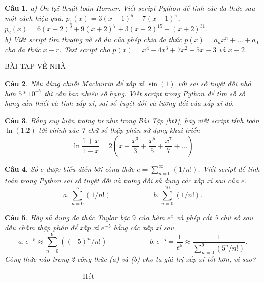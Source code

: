 \documentclass[answers]{exam}
\newtheorem{bt}{Câu}
\begin{document}
\begin{bt} a) Ôn lại thuật toán Horner. Viết script Python để tính các đa thức sau một cách hiệu quả.
$p_1(x) = 3(x-1)^5+7(x-1)^9$, \quad $p_2(x) = 6(x+2)^3 + 9(x+2)^7 + 3 (x+2)^{15} - (x+2)^{31}.$	 \\
	
b) Viết script tìm thương và số dư của phép chia đa thức $p(x)=a_nx^n+...+a_0$ cho đa thức $x-r$.
Test script cho $p(x)=x^4-4x^3+7x^2-5x-3$ và $x-2$.
\end{bt}


BÀI TẬP VỀ NHÀ

\begin{bt}
Nếu dùng chuỗi Maclaurin để xấp xỉ $\sin(1)$ với sai số tuyệt đối nhỏ hơn $5 * 10^{-7}$ thì cần bao nhiêu số hạng. Viết script trong Python để tìm số số hạng cần thiết và tính xấp xỉ, sai số tuyệt đối và tương đối của xấp xỉ đó.
\end{bt}

\begin{bt} 
Bằng suy luận tương tự như trong Bài Tập \ref{bt1}, hãy viết script tính toán $\ln(1.2)$ tới chính xác 7 chữ số thập phân sử dụng khai triển 
%
\[
\ln \dfrac{1+x}{1-x} = 2 \left( x + \dfrac{x^3}{3} + \dfrac{x^5}{5} + \dfrac{x^7}{7} + ...  \right)
\]
%
\end{bt}

\begin{bt}
Số $e$ được biểu diễn bởi công thức $e = \sum_{n=0}^{\infty}(1/n!)$. Viết script để tính toán trong Python 
sai số tuyệt đối và tương đối sử dụng các xấp xỉ sau của $e$.
%
\[ 
a. \ \sum_{n=0}^{5}(1/n!) \qquad \qquad \qquad b. \ \sum_{n=0}^{10}(1/n!).
\] 
%
\end{bt}

\begin{bt}
Hãy sử dụng đa thức Taylor bậc $9$ của hàm $e^x$ và phép cắt 5 chữ số sau dấu chấm thập phân để xấp xỉ $e^{-5}$ bằng các xấp xỉ sau.
%
\[
a.\ e^{-5} \approx \sum_{n=0}^{9}((-5)^n/n!) \qquad \qquad \qquad b.\ e^{-5} = \frac{1}{e^5} \approx \frac{1}{\sum_{n=0}^{9}(5^n/n!)}. 
\]
%
Công thức nào trong 2 công thức (a) và (b) cho ta giá trị xấp xỉ tốt hơn, vì sao?
\end{bt}

\centerline{———————————Hết——————————}

% 
   
\end{document}
